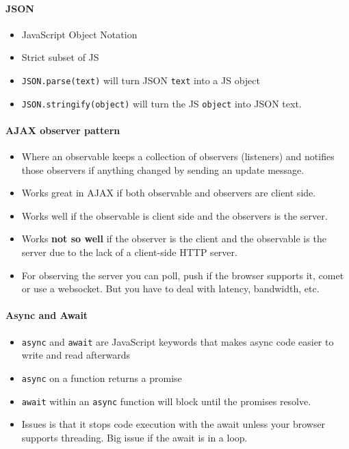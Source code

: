 \documentclass[../CMPUT-404-Notes.tex]{subfiles}
\begin{document}
\paragraph{JSON}
\begin{itemize}
  \item JavaScript Object Notation
  \item Strict subset of JS 
  \item \texttt{JSON.parse(text)} will turn JSON \texttt{text} into a JS object
  \item \texttt{JSON.stringify(object)} will turn the JS \texttt{object} into JSON text.
\end{itemize}
\paragraph{AJAX observer pattern}
\begin{itemize}
  \item Where an observable keeps a collection of observers (listeners) and notifies those observers if anything changed by sending an update message.
  \item Works great in AJAX if both observable and observers are client side.
  \item Works well if the observable is client side and the observers is the server.
  \item Works \textbf{not so well} if the observer is the client and the observable is the server due to the lack of a client-side HTTP server.
  \item For observing the server you can poll, push if the browser supports it, comet or use a websocket. But you have to deal with latency, bandwidth, etc.
\end{itemize}
\paragraph{Async and Await}
\begin{itemize}
  \item \texttt{async} and \texttt{await} are JavaScript keywords that makes async code easier to write and read afterwards
  \item \texttt{async} on a function returns a promise
  \item \texttt{await} within an \texttt{async} function will block until the promises resolve.
  \item Issues is that it stops code execution with the await unless your browser supports threading. Big issue if the await is in a loop.
\end{itemize}
\end{document}
